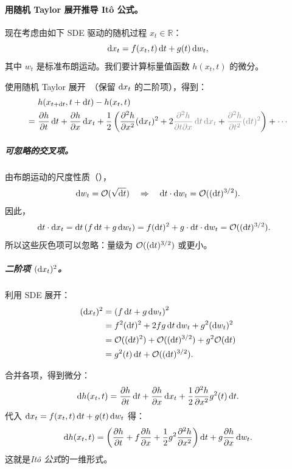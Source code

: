 \paragraph{用随机 Taylor 展开推导 It\^o 公式。}
现在考虑由如下 SDE 驱动的随机过程 $x_t \in \mathbb{R}$：
\[
\mathop{}\!\mathrm{d} x_t = f(x_t, t) \mathop{}\!\mathrm{d} t + g(t) \mathop{}\!\mathrm{d} w_t,
\]
其中 $w_t$ 是标准布朗运动。我们要计算标量值函数 $h(x_t, t)$ 的微分。

使用随机 Taylor 展开~\citep{kloeden1992stochastic}（保留 $\mathop{}\!\mathrm{d} x_t$ 的二阶项），得到：
\begin{align*}
&h(x_{t+\diff t}, t+\diff t) 
- h(x_t, t) \\
=~&\frac{\partial h}{\partial t} \diff t 
+ \frac{\partial h}{\partial x} \diff x_t 
+ \frac{1}{2} \left( \frac{\partial^2 h}{\partial x^2} (\diff x_t)^2 
+ 2\textcolor{gray}{{\frac{\partial^2 h}{\partial t \partial x} \diff t \diff x_t}} 
+ \textcolor{gray}{{ \frac{\partial^2 h}{\partial t^2} (\diff t)^2}} \right)
+ \cdots
\end{align*}
\subparagraph{可忽略的交叉项。}
由布朗运动的尺度性质（），
\[
\mathop{}\!\mathrm{d} w_t = \mathcal{O}(\sqrt{\mathop{}\!\mathrm{d} t}) \quad \Rightarrow \quad \mathop{}\!\mathrm{d} t \cdot \mathop{}\!\mathrm{d} w_t = \mathcal{O}((\mathop{}\!\mathrm{d} t)^{3/2}).
\]
因此，
\begin{align*}
\diff t \cdot \diff x_t 
&= \diff t \left(f \diff t + g \diff w_t\right) 
= f (\diff t)^2 + g \cdot \diff t \cdot \diff w_t 
= \mathcal{O}((\diff t)^{3/2}).
\end{align*}
所以这些灰色项可以忽略：量级为 $ \mathcal{O}((\mathop{}\!\mathrm{d} t)^{3/2}) $ 或更小。
\subparagraph{二阶项 $(\mathop{}\!\mathrm{d} x_t)^2$。}
利用 SDE 展开：
\begin{align*}
(\diff x_t)^2 
&= \left( f \diff t + g \diff w_t \right)^2 \\
&= f^2 (\diff t)^2 + 2fg \diff t \diff w_t + g^2 (\diff w_t)^2 \\
&= \mathcal{O}((\diff t)^2) + \mathcal{O}((\diff t)^{3/2}) + g^2 \mathcal{O}(\diff t) \\
&= g^2(t) \diff t + \mathcal{O}((\diff t)^{3/2}).
\end{align*}

合并各项，得到微分：
\[
\mathop{}\!\mathrm{d} h(x_t, t)
= \frac{\partial h}{\partial t} \mathop{}\!\mathrm{d} t
+ \frac{\partial h}{\partial x} \mathop{}\!\mathrm{d} x_t
+ \frac{1}{2} \frac{\partial^2 h}{\partial x^2} g^2(t) \mathop{}\!\mathrm{d} t.
\]
代入 $ \mathop{}\!\mathrm{d} x_t = f(x_t, t) \mathop{}\!\mathrm{d} t + g(t) \mathop{}\!\mathrm{d} w_t $ 得：
\[
\mathop{}\!\mathrm{d} h(x_t, t)
= \left( \frac{\partial h}{\partial t} + f \frac{\partial h}{\partial x}
+ \frac{1}{2} g^2 \frac{\partial^2 h}{\partial x^2} \right) \mathop{}\!\mathrm{d} t
+ g \frac{\partial h}{\partial x} \mathop{}\!\mathrm{d} w_t.
\]
这就是\emph{It\^o 公式}的一维形式。



